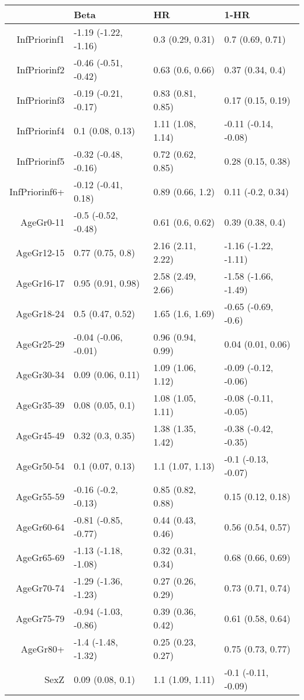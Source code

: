 \begin{table}[ht]
\centering
\begin{tabular}{rlll}
  \hline
 & Beta & HR & 1-HR \\ 
  \hline
InfPriorinf1 & -1.19 (-1.22, -1.16) & 0.3 (0.29, 0.31) & 0.7 (0.69, 0.71) \\ 
  InfPriorinf2 & -0.46 (-0.51, -0.42) & 0.63 (0.6, 0.66) & 0.37 (0.34, 0.4) \\ 
  InfPriorinf3 & -0.19 (-0.21, -0.17) & 0.83 (0.81, 0.85) & 0.17 (0.15, 0.19) \\ 
  InfPriorinf4 & 0.1 (0.08, 0.13) & 1.11 (1.08, 1.14) & -0.11 (-0.14, -0.08) \\ 
  InfPriorinf5 & -0.32 (-0.48, -0.16) & 0.72 (0.62, 0.85) & 0.28 (0.15, 0.38) \\ 
  InfPriorinf6+ & -0.12 (-0.41, 0.18) & 0.89 (0.66, 1.2) & 0.11 (-0.2, 0.34) \\ 
  AgeGr0-11 & -0.5 (-0.52, -0.48) & 0.61 (0.6, 0.62) & 0.39 (0.38, 0.4) \\ 
  AgeGr12-15 & 0.77 (0.75, 0.8) & 2.16 (2.11, 2.22) & -1.16 (-1.22, -1.11) \\ 
  AgeGr16-17 & 0.95 (0.91, 0.98) & 2.58 (2.49, 2.66) & -1.58 (-1.66, -1.49) \\ 
  AgeGr18-24 & 0.5 (0.47, 0.52) & 1.65 (1.6, 1.69) & -0.65 (-0.69, -0.6) \\ 
  AgeGr25-29 & -0.04 (-0.06, -0.01) & 0.96 (0.94, 0.99) & 0.04 (0.01, 0.06) \\ 
  AgeGr30-34 & 0.09 (0.06, 0.11) & 1.09 (1.06, 1.12) & -0.09 (-0.12, -0.06) \\ 
  AgeGr35-39 & 0.08 (0.05, 0.1) & 1.08 (1.05, 1.11) & -0.08 (-0.11, -0.05) \\ 
  AgeGr45-49 & 0.32 (0.3, 0.35) & 1.38 (1.35, 1.42) & -0.38 (-0.42, -0.35) \\ 
  AgeGr50-54 & 0.1 (0.07, 0.13) & 1.1 (1.07, 1.13) & -0.1 (-0.13, -0.07) \\ 
  AgeGr55-59 & -0.16 (-0.2, -0.13) & 0.85 (0.82, 0.88) & 0.15 (0.12, 0.18) \\ 
  AgeGr60-64 & -0.81 (-0.85, -0.77) & 0.44 (0.43, 0.46) & 0.56 (0.54, 0.57) \\ 
  AgeGr65-69 & -1.13 (-1.18, -1.08) & 0.32 (0.31, 0.34) & 0.68 (0.66, 0.69) \\ 
  AgeGr70-74 & -1.29 (-1.36, -1.23) & 0.27 (0.26, 0.29) & 0.73 (0.71, 0.74) \\ 
  AgeGr75-79 & -0.94 (-1.03, -0.86) & 0.39 (0.36, 0.42) & 0.61 (0.58, 0.64) \\ 
  AgeGr80+ & -1.4 (-1.48, -1.32) & 0.25 (0.23, 0.27) & 0.75 (0.73, 0.77) \\ 
  SexZ & 0.09 (0.08, 0.1) & 1.1 (1.09, 1.11) & -0.1 (-0.11, -0.09) \\ 
   \hline
\end{tabular}
\end{table}
